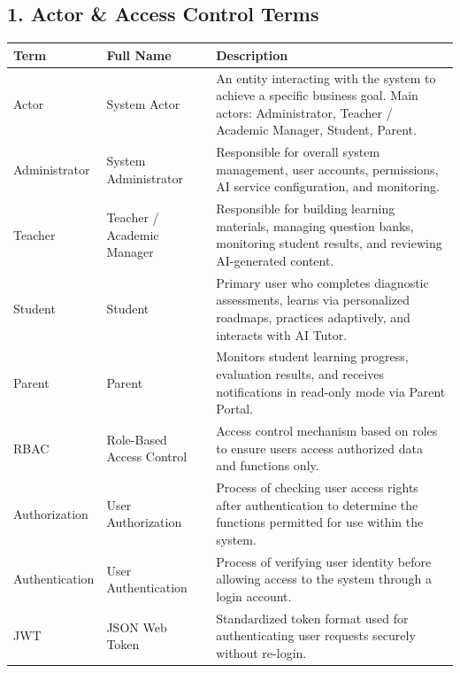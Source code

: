 \documentclass[12pt,a4paper]{article}
\begin{document}
\subsection*{1. Actor \& Access Control Terms}
\begin{table}[H]
\centering
\small
\renewcommand{\arraystretch}{1.3}
\begin{tabularx}{\textwidth}{p{2.6cm} p{4.2cm} X}
\toprule
\textbf{Term} & \textbf{Full Name} & \textbf{Description} \\
\midrule
Actor & System Actor & An entity interacting with the system to achieve a specific business goal. Main actors: Administrator, Teacher / Academic Manager, Student, Parent. \\
\addlinespace[0.3em]
Administrator & System Administrator & Responsible for overall system management, user accounts, permissions, AI service configuration, and monitoring. \\
\addlinespace[0.3em]
Teacher & Teacher / Academic Manager & Responsible for building learning materials, managing question banks, monitoring student results, and reviewing AI-generated content. \\
\addlinespace[0.3em]
Student & Student & Primary user who completes diagnostic assessments, learns via personalized roadmaps, practices adaptively, and interacts with AI Tutor. \\
\addlinespace[0.3em]
Parent & Parent & Monitors student learning progress, evaluation results, and receives notifications in read-only mode via Parent Portal. \\
\addlinespace[0.3em]
RBAC & Role-Based Access Control & Access control mechanism based on roles to ensure users access authorized data and functions only. \\
\addlinespace[0.3em]
Authorization & User Authorization & Process of checking user access rights after authentication to determine the functions permitted for use within the system. \\
\addlinespace[0.3em]
Authentication & User Authentication & Process of verifying user identity before allowing access to the system through a login account. \\
\addlinespace[0.3em]
JWT & JSON Web Token & Standardized token format used for authenticating user requests securely without re-login. \\
\bottomrule
\end{tabularx}
\end{table}
\end{document}
